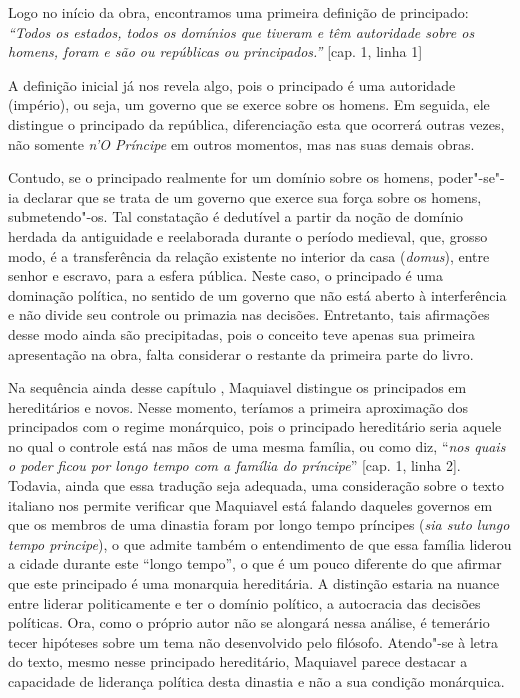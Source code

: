 Logo no início da obra, encontramos uma primeira definição de
principado: \emph{``Todos os estados, todos os domínios que tiveram e
têm autoridade sobre os homens, foram e são ou repúblicas ou
principados.''} {[}cap. 1, linha 1{]}

A definição inicial já nos revela algo, pois o principado é uma
autoridade (império), ou seja, um governo que se exerce sobre os homens.
Em seguida, ele distingue o principado da república, diferenciação esta
que ocorrerá outras vezes, não somente \emph{n'O Príncipe} em outros
momentos, mas nas suas demais obras.

Contudo, se o principado realmente for um domínio sobre os homens,
poder"-se"-ia declarar que se trata de um governo que exerce sua força
sobre os homens, submetendo"-os. Tal constatação é dedutível a partir da
noção de domínio herdada da antiguidade e reelaborada durante o período
medieval, que, grosso modo, é a transferência da relação existente no
interior da casa (\emph{domus}), entre senhor e escravo, para a esfera
pública. Neste caso, o principado é uma dominação política, no sentido
de um governo que não está aberto à interferência e não divide seu
controle ou primazia nas decisões. Entretanto, tais afirmações desse
modo ainda são precipitadas, pois o conceito teve apenas sua primeira
apresentação na obra, falta considerar o restante da primeira parte do
livro.

Na sequência ainda desse capítulo , Maquiavel distingue os principados
em hereditários e novos. Nesse momento, teríamos a primeira aproximação
dos principados com o regime monárquico, pois o principado hereditário
seria aquele no qual o controle está nas mãos de uma mesma família, ou
como diz, ``\emph{nos quais o poder ficou por longo tempo com a família
do príncipe}'' {[}cap. 1, linha 2{]}. Todavia, ainda que essa tradução
seja adequada, uma consideração sobre o texto italiano nos permite
verificar que Maquiavel está falando daqueles governos em que os membros
de uma dinastia foram por longo tempo príncipes (\emph{sia suto lungo
tempo principe}), o que admite também o entendimento de que essa família
liderou a cidade durante este ``longo tempo'', o que é um pouco
diferente do que afirmar que este principado é uma monarquia
hereditária. A distinção estaria na nuance entre liderar politicamente e
ter o domínio político, a autocracia das decisões políticas. Ora, como o
próprio autor não se alongará nessa análise, é temerário tecer hipóteses
sobre um tema não desenvolvido pelo filósofo. Atendo"-se à letra do
texto, mesmo nesse principado hereditário, Maquiavel parece destacar a
capacidade de liderança política desta dinastia e não a sua condição
monárquica.

